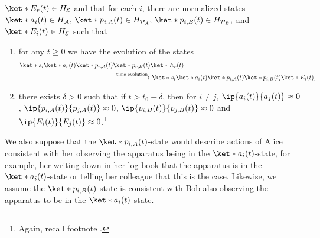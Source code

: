 \documentclass[12pt]{report}
\begin{document}
%
    $\ket*{E_r(t)}\in H_\mathcal{E}$ and %
    that for each $i$, there are normalized states $\ket*{a_i(t)}\in H_\mathcal{A},\,\ket*{p_{i, A}(t)}\in H_{\mathcal{P}_A},\,\ket*{p_{i, B}(t)}\in H_{\mathcal{P}_B},$ and $\ket*{E_i(t)}\in H_\mathcal{E}$ such 
    that 
%
    \begin{enumerate}[noitemsep, nosep, topsep=0pt]
    \item for any $t\geq 0$ we have the evolution of the states 
    \begin{align*}\ket*{s_i}\ket*{a_r(t)}\ket*{p_{r, A}(t)}&\ket*{p_{r, B}(t)}\ket*{E_r(t)}\\ &\xrightarrow{\text{time evolution}}\ket*{s_i}\ket*{a_i(t)}\ket*{p_{i, A}(t)}\ket*{p_{i, B}(t)}\ket*{E_i(t)},\end{align*}
    \item there exists $\delta>0$ such that if $t>t_0+\delta$, then for $i\neq j$, $\ip{a_i(t)}{a_j(t)}\approx 0$, $\ip{p_{i, A}(t)}{p_{j, A}(t)}\approx 0$, $\ip{p_{i, B}(t)}{p_{j, B}(t)}\approx 0$ and $\ip{E_i(t)}{E_j(t)}\approx 0$.\footnote{Again, recall footnote .}
    \end{enumerate}
    We also suppose that the $\ket*{p_{i,A}(t)}$-state would describe actions of Alice consistent with her observing the apparatus being in the $\ket*{a_i(t)}$-state, for example, her writing down in her log book that the apparatus is in the $\ket*{a_i(t)}$-state or telling her colleague that this is the case. Likewise, we assume the $\ket*{p_{i,B}(t)}$-state is consistent with Bob also observing the apparatus to be in the $\ket*{a_i(t)}$-state.
    
\end{document}
